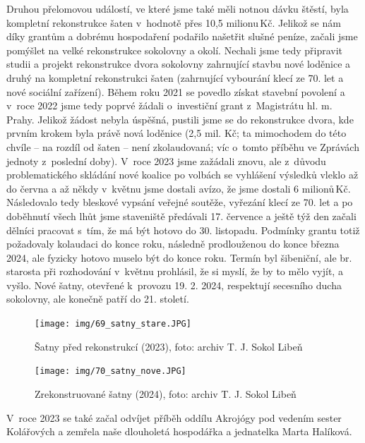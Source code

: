 \documentclass[a5paper, 11pt, twoside]{article}
\begin{document}
Druhou přelomovou událostí, ve které jsme také měli notnou dávku štěstí,
byla kompletní rekonstrukce šaten v~hodnotě přes 10,5 milionu\,Kč.
Jelikož se nám díky grantům a dobrému hospodaření podařilo našetřit
slušné peníze, začali jsme pomýšlet na velké rekonstrukce sokolovny a
okolí. Nechali jsme tedy připravit studii a projekt rekonstrukce dvora
sokolovny zahrnující stavbu nové loděnice a druhý na kompletní
rekonstrukci šaten (zahrnující vybourání klecí ze 70. let a nové
sociální zařízení). Během roku 2021 se povedlo získat stavební povolení
a v~roce 2022 jsme tedy poprvé žádali o~investiční grant z~Magistrátu
hl. m. Prahy. Jelikož žádost nebyla úspěšná, pustili jsme se do
rekonstrukce dvora, kde prvním krokem byla právě nová loděnice (2,5 mil.
Kč; ta mimochodem do této chvíle -- na rozdíl od šaten -- není
zkolaudovaná; víc o~tomto příběhu ve Zprávách jednoty z~poslední doby).
V~roce 2023 jsme zažádali znovu, ale z~důvodu problematického skládání
nové koalice po volbách se vyhlášení výsledků vleklo až do června a až
někdy v~květnu jsme dostali avízo, že jsme dostali 6 milionů\,Kč.
Následovalo tedy bleskové vypsání veřejné soutěže, vyřezání klecí ze 70.
let a po doběhnutí všech lhůt jsme staveniště předávali 17. července a
ještě týž den začali dělníci pracovat s~tím, že má být hotovo do 30.
listopadu. Podmínky grantu totiž požadovaly kolaudaci do konce roku,
následně prodlouženou do konce března 2024, ale fyzicky hotovo muselo
být do konce roku. Termín byl šibeniční, ale br. starosta při
rozhodování v~květnu prohlásil, že si myslí, že by to mělo vyjít, a
vyšlo. Nové šatny, otevřené k~provozu 19. 2. 2024, respektují secesního
ducha sokolovny, ale konečně patří do 21. století.

\begin{figure}[hp]
  \centering 
  \texttt{[image: img/69\_satny\_stare.JPG]}
  \caption*{Šatny před rekonstrukcí (2023), foto: archiv T. J. Sokol Libeň}
\end{figure}

\begin{figure}[hp]
  \centering 
  \texttt{[image: img/70\_satny\_nove.JPG]}
  \caption*{Zrekonstruované šatny (2024), foto: archiv T. J. Sokol Libeň}
\end{figure}

V~roce 2023 se také začal odvíjet příběh oddílu Akrojógy pod vedením
sester Kolářových a zemřela naše dlouholetá hospodářka a jednatelka
Marta Halíková.
\end{document}
